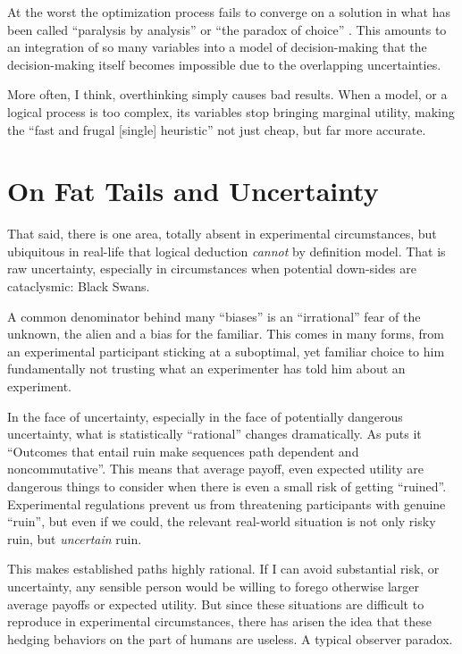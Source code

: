 \documentclass{article}
\begin{document}
At the worst the optimization process fails to converge on a solution in what has been called ``paralysis by analysis'' or ``the paradox of choice'' \parencite{schwartz04}.
This amounts to an integration of so many variables into a model of decision-making that the decision-making itself becomes impossible due to the overlapping uncertainties.

More often, I think, overthinking simply causes bad results.
When a model, or a logical process is too complex, its variables stop bringing marginal utility, making the ``fast and frugal [single] heuristic'' not just cheap, but far more accurate.

\section{On Fat Tails and Uncertainty\label{tails}}

That said, there is one area, totally absent in experimental circumstances, but ubiquitous in real-life that logical deduction \emph{cannot} by definition model.
That is raw uncertainty, especially in circumstances when potential down-sides are cataclysmic: Black Swans.

A common denominator behind many ``biases'' is an ``irrational'' fear of the unknown, the alien and a bias for the familiar.
This comes in many forms, from an experimental participant sticking at a suboptimal, yet familiar choice to him fundamentally not trusting what an experimenter has told him about an experiment.

In the face of uncertainty, especially in the face of potentially dangerous uncertainty, what is statistically ``rational'' changes dramatically.
As \textcite{taleb18} puts it ``Outcomes that entail ruin make sequences path dependent and noncommutative''.
This means that average payoff, even expected utility are dangerous things to consider when there is even a small risk of getting ``ruined''.
Experimental regulations prevent us from threatening participants with genuine ``ruin'', but even if we could, the relevant real-world situation is not only risky ruin, but \emph{uncertain} ruin.

This makes established paths highly rational.
If I can avoid substantial risk, or uncertainty, any sensible person would be willing to forego otherwise larger average payoffs or expected utility.
But since these situations are difficult to reproduce in experimental circumstances, there has arisen the idea that these hedging behaviors on the part of humans are useless.
A typical observer paradox.
\end{document}
